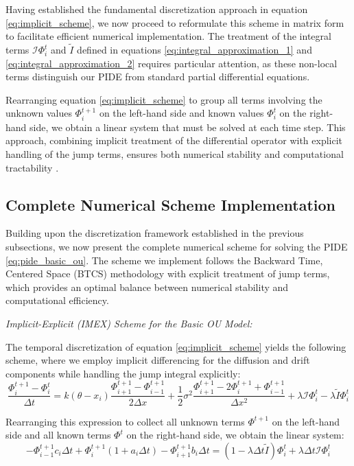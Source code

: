 \documentclass[11pt,twoside,openright]{report}
\begin{document}
Having established the fundamental discretization approach in equation \eqref{eq:implicit_scheme}, we now proceed to reformulate this scheme in matrix form to facilitate efficient numerical implementation. The treatment of the integral terms $\mathcal{I}\Phi^t_i$ and $\tilde{I}$ defined in equations \eqref{eq:integral_approximation_1} and \eqref{eq:integral_approximation_2} requires particular attention, as these non-local terms distinguish our PIDE from standard partial differential equations.

Rearranging equation \eqref{eq:implicit_scheme} to group all terms involving the unknown values $\Phi^{t+1}_i$ on the left-hand side and known values $\Phi^t_i$ on the right-hand side, we obtain a linear system that must be solved at each time step. This approach, combining implicit treatment of the differential operator with explicit handling of the jump terms, ensures both numerical stability and computational tractability \cite{georgiou2023thesis}.

\subsection{Complete Numerical Scheme Implementation}

Building upon the discretization framework established in the previous subsections, we now present the complete numerical scheme for solving the PIDE \eqref{eq:pide_basic_ou}. The scheme we implement follows the Backward Time, Centered Space (BTCS) methodology with explicit treatment of jump terms, which provides an optimal balance between numerical stability and computational efficiency.

\textit{Implicit-Explicit (IMEX) Scheme for the Basic OU Model:}

The temporal discretization of equation \eqref{eq:implicit_scheme} yields the following scheme, where we employ implicit differencing for the diffusion and drift components while handling the jump integral explicitly:
$$ \frac{\Phi^{t+1}_i - \Phi^t_i}{\Delta t} = k(\theta - x_i)\frac{\Phi^{t+1}_{i+1} - \Phi^{t+1}_{i-1}}{2\Delta x} + \frac{1}{2}\sigma^2 \frac{\Phi^{t+1}_{i+1} - 2\Phi^{t+1}_i + \Phi^{t+1}_{i-1}}{\Delta x^2} + \lambda\mathcal{I}\Phi^t_i - \lambda\tilde{I}\Phi^t_i $$

Rearranging this expression to collect all unknown terms $\Phi^{t+1}$ on the left-hand side and all known terms $\Phi^t$ on the right-hand side, we obtain the linear system:
$$ -\Phi^{t+1}_{i-1} c_i \Delta t + \Phi^{t+1}_i (1 + a_i \Delta t) - \Phi^{t+1}_{i+1} b_i \Delta t = (1 - \lambda \Delta t \tilde{I})\Phi^t_i + \lambda \Delta t \mathcal{I}\Phi^t_i $$
\end{document}
